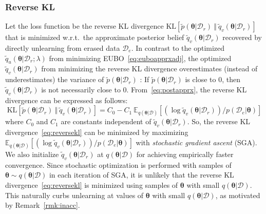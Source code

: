 \documentclass{article}
\theoremstyle{definition}
\newcommand{\mcl}[1]{\mathcal{#1}}
\newcommand{\mbb}[1]{\mathbb{#1}}
\newcommand{\da}{\mcl{D}}
\newcommand{\dc}{\mcl{D}_r}
\newcommand{\dr}{\mcl{D}_e}
\newcommand{\eubo}{\tilde{q}_u}
\newcommand{\elbo}{\tilde{q}_v}
\begin{document}
\subsubsection{Reverse KL}
\label{subsubsec:rkl}
%
Let the loss function be the reverse KL divergence $\text{KL}[\tilde{p}(\bm{\theta}|\dc)\ \Vert\ \elbo(\bm{\theta}|\dc)]$ that is minimized w.r.t.~the approximate posterior belief $\elbo(\bm{\theta}|\dc)$ recovered by directly unlearning from erased data $\dr$. 
In contrast to the optimized $\eubo(\bm{\theta}|\dc; \lambda)$
from minimizing EUBO~\eqref{eq:euboapprxadj}, 
the optimized $\elbo(\bm{\theta}|\dc)$ from minimizing the reverse KL divergence 
overestimates (instead of underestimates) the variance of $\tilde{p}(\bm{\theta}|\dc)$ \cite{bishop2006pattern}: If $\tilde{p}(\bm{\theta}|\dc)$ is close to $0$, then $\elbo(\bm{\theta}|\dc)$ is not necessarily close to $0$.
From~\eqref{eq:postapprx}, the reverse KL divergence can be expressed as follows:
%
\begin{equation}
\text{KL}[\tilde{p}(\bm{\theta}|\dc)\ \Vert\ \elbo(\bm{\theta}|\dc)] 
	= C_0 - C_1\  \mbb{E}_{q(\bm{\theta}|\da)} \left[(\log \elbo(\bm{\theta}|\dc))/{p(\dr|\bm{\theta})}  \right]
\label{eq:reversekl}
\end{equation}
%
where $C_0$ and $C_1$ are constants independent of $\elbo(\bm{\theta}|\dc)$. So, the reverse KL divergence~\eqref{eq:reversekl} can be minimized by maximizing $\mbb{E}_{q(\bm{\theta}|\da)} [ (\log \elbo(\bm{\theta}|\dc)) / p(\dr|\bm{\theta}) ]$ with \emph{stochastic gradient ascent} (SGA).
We also initialize $\elbo(\bm{\theta}|\dc)$ at $q(\bm{\theta}|\da)$ for achieving empirically faster convergence.
Since stochastic optimization is performed with samples of $\bm{\theta} \sim q(\bm{\theta}|\da)$ in each iteration of SGA, it is unlikely that the reverse KL divergence~\eqref{eq:reversekl} is minimized using samples of $\bm{\theta}$ with small $q(\bm{\theta}|\da)$.
This naturally curbs unlearning at values of $\bm{\theta}$ with small $q(\bm{\theta}|\da)$, as motivated by Remark~\ref{rmk:inacc}.
%
\end{document}
